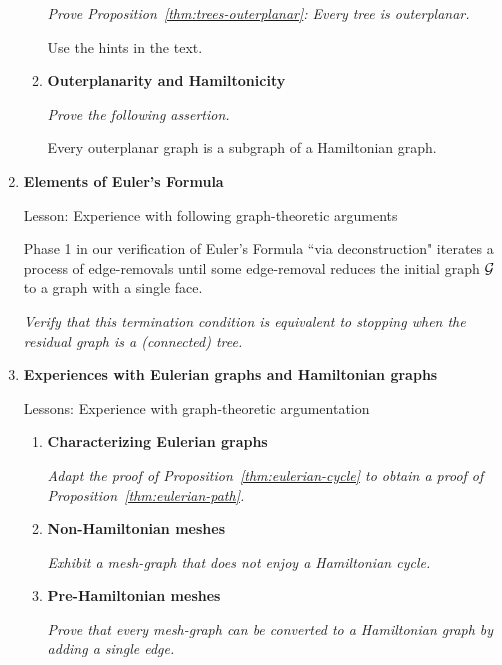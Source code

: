 \begin{enumerate}
\begin{enumerate}
{\em Prove Proposition~\ref{thm:trees-outerplanar}: Every tree is outerplanar.}

\smallskip

Use the hints in the text.

  \medskip\item
{\bf Outerplanarity and Hamiltonicity}

\smallskip

{\em Prove the following assertion.}

\begin{prop}
Every outerplanar graph is a subgraph of a Hamiltonian graph.
\end{prop}
  \end{enumerate}

\medskip\item
{\bf Elements of Euler's Formula}

{\sc Lesson:} Experience with following graph-theoretic arguments

\smallskip

Phase 1 in our verification of Euler's Formula ``via deconstruction" iterates a process of edge-removals until some edge-removal reduces the initial graph $\mbox{$\cal G$}$ to a graph with a single face.

\smallskip

{\em Verify that this termination condition is equivalent to stopping when the residual graph is a (connected) tree.}

\medskip\item
{\bf Experiences with Eulerian graphs and Hamiltonian graphs}

{\sc Lessons:} Experience with graph-theoretic argumentation

  \begin{enumerate}
  \item
{\bf Characterizing Eulerian graphs}

\smallskip

{\em Adapt the proof of Proposition~\ref{thm:eulerian-cycle} to obtain a proof of Proposition~\ref{thm:eulerian-path}.}

  \medskip\item
{\bf Non-Hamiltonian meshes}

\smallskip

{\em Exhibit a mesh-graph that does not enjoy a Hamiltonian cycle.}

  \medskip\item
{\bf Pre-Hamiltonian meshes}

\smallskip

{\em Prove that every mesh-graph can be converted to a Hamiltonian graph by adding a single edge.}
  \end{enumerate}
\end{enumerate}

